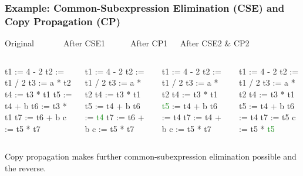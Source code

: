 \documentclass{beamer}
\newcommand{\green}[1]{\textcolor{Green}{{#1}}}
\newcommand{\emp}[1]{\textcolor{DikuRed}{ #1}}
\begin{document}
\begin{frame}[fragile,t]
    \frametitle{Example: Common-Subexpression Elimination
                    (CSE) and Copy Propagation (CP)}

\bigskip

\begin{block}{Original{\tt~~~~~~~}After CSE1{\tt~~~~~~}After CP1{\tt~~~}After CSE2 \& CP2}
\begin{columns}
\begin{colorcode}[fontsize=\scriptsize]
t1 := 4  - 2
t2 := t1 / 2
t3 := a  * t2
t4 := \emp{t3 * t1}
t5 := t4 + b
t6 := \emp{t3 * t1}
t7 := t6 + b
c  := t5 * t7
\end{colorcode} 
\begin{colorcode}[fontsize=\scriptsize]
t1 := 4  - 2
t2 := t1 / 2
t3 := a  * t2
t4 := t3 * t1
t5 := t4 + b
\emp{t6} := \green{t4}
t7 := \emp{t6} + b
c  := t5 * t7
\end{colorcode} 
\begin{colorcode}[fontsize=\scriptsize]
t1 := 4  - 2
t2 := t1 / 2
t3 := a  * t2
t4 := t3 * t1
\green{t5} := \emp{t4 + b}
t6 := t4
t7 := \emp{t4 + b}
c  := t5 * t7
\end{colorcode} 
\begin{colorcode}[fontsize=\scriptsize]
t1 := 4  - 2
t2 := t1 / 2
t3 := a  * t2
t4 := t3 * t1
t5 := \emp{t4 + b}
t6 := t4
t7 := t5
c  := t5 * \green{t5}
\end{colorcode} 
\end{columns}
\end{block}

\bigskip

Copy propagation makes further common-subexpression elimination
possible and the reverse.

\end{frame}
\end{document}
